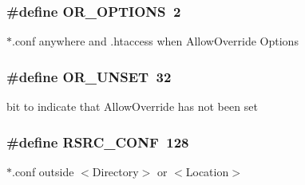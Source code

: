 \subsubsection[{\texorpdfstring{O\+R\+\_\+\+O\+P\+T\+I\+O\+NS}{OR_OPTIONS}}]{\setlength{\rightskip}{0pt plus 5cm}\#define O\+R\+\_\+\+O\+P\+T\+I\+O\+NS~2}\hypertarget{group__ConfigDirectives_ga498a222873d29356a1ab9bd3f936b270}{}\label{group__ConfigDirectives_ga498a222873d29356a1ab9bd3f936b270}
$\ast$.conf anywhere and .htaccess when Allow\+Override Options 
\subsubsection[{\texorpdfstring{O\+R\+\_\+\+U\+N\+S\+ET}{OR_UNSET}}]{\setlength{\rightskip}{0pt plus 5cm}\#define O\+R\+\_\+\+U\+N\+S\+ET~32}\hypertarget{group__ConfigDirectives_ga45fe697d7e968bc74055405fa88cad13}{}\label{group__ConfigDirectives_ga45fe697d7e968bc74055405fa88cad13}
bit to indicate that Allow\+Override has not been set 
\subsubsection[{\texorpdfstring{R\+S\+R\+C\+\_\+\+C\+O\+NF}{RSRC_CONF}}]{\setlength{\rightskip}{0pt plus 5cm}\#define R\+S\+R\+C\+\_\+\+C\+O\+NF~128}\hypertarget{group__ConfigDirectives_ga2c51f4c7392fa5af1afe797470dc16e3}{}\label{group__ConfigDirectives_ga2c51f4c7392fa5af1afe797470dc16e3}
$\ast$.conf outside $<$Directory$>$ or $<$Location$>$ 